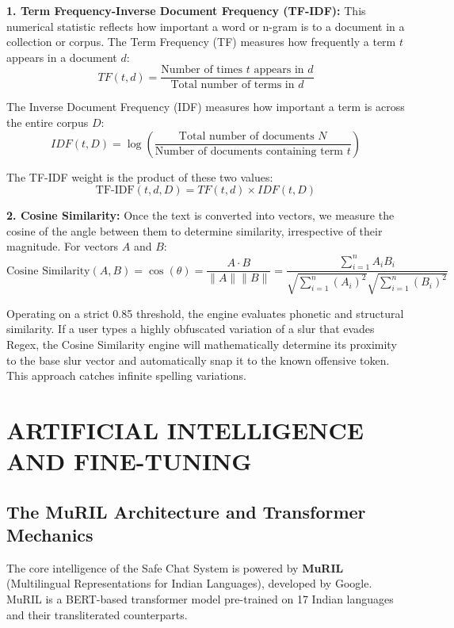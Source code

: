 \documentclass[12pt,a4paper]{report}
\begin{document}
\textbf{1. Term Frequency-Inverse Document Frequency (TF-IDF):}
This numerical statistic reflects how important a word or n-gram is to a document in a collection or corpus.
The Term Frequency (TF) measures how frequently a term $t$ appears in a document $d$:
\begin{equation}
TF(t, d) = \frac{\text{Number of times } t \text{ appears in } d}{\text{Total number of terms in } d}
\end{equation}

The Inverse Document Frequency (IDF) measures how important a term is across the entire corpus $D$:
\begin{equation}
IDF(t, D) = \log \left( \frac{\text{Total number of documents } N}{\text{Number of documents containing term } t} \right)
\end{equation}

The TF-IDF weight is the product of these two values:
\begin{equation}
\text{TF-IDF}(t, d, D) = TF(t, d) \times IDF(t, D)
\end{equation}

\textbf{2. Cosine Similarity:}
Once the text is converted into vectors, we measure the cosine of the angle between them to determine similarity, irrespective of their magnitude. For vectors $A$ and $B$:
\begin{equation}
\text{Cosine Similarity}(A, B) = \cos(\theta) = \frac{A \cdot B}{\|A\| \|B\|} = \frac{\sum_{i=1}^{n} A_i B_i}{\sqrt{\sum_{i=1}^{n} (A_i)^2} \sqrt{\sum_{i=1}^{n} (B_i)^2}}
\end{equation}

Operating on a strict 0.85 threshold, the engine evaluates phonetic and structural similarity. If a user types a highly obfuscated variation of a slur that evades Regex, the Cosine Similarity engine will mathematically determine its proximity to the base slur vector and automatically snap it to the known offensive token. This approach catches infinite spelling variations.

\chapter{ARTIFICIAL INTELLIGENCE AND FINE-TUNING}

\section{The MuRIL Architecture and Transformer Mechanics}
The core intelligence of the Safe Chat System is powered by \textbf{MuRIL} (Multilingual Representations for Indian Languages), developed by Google. MuRIL is a BERT-based transformer model pre-trained on 17 Indian languages and their transliterated counterparts.
\end{document}
